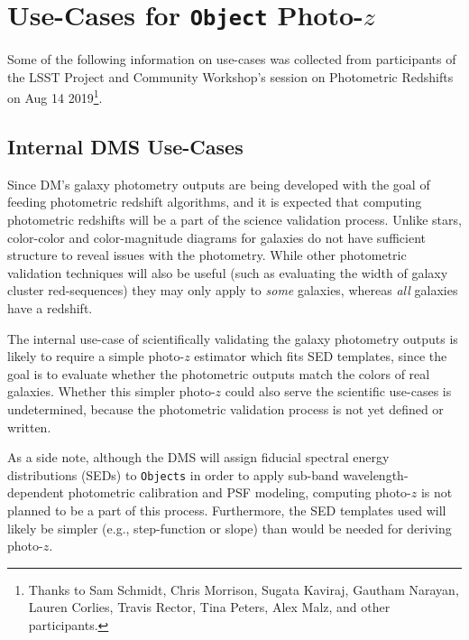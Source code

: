 \documentclass[DM,lsstdraft,toc]{lsstdoc}
\begin{document}




\section{Use-Cases for {\tt Object} Photo-$z$} \label{sec:use}

Some of the following information on use-cases was collected from participants of the LSST Project and Community Workshop's session on Photometric Redshifts on Aug 14 2019\footnote{Thanks to Sam Schmidt, Chris Morrison, Sugata Kaviraj, Gautham Narayan, Lauren Corlies, Travis Rector, Tina Peters, Alex Malz, and other participants.}.

\subsection{Internal DMS Use-Cases}\label{ssec:use_dm}

Since DM's galaxy photometry outputs are being developed with the goal of feeding photometric redshift algorithms, and it is expected that computing photometric redshifts will be a part of the science validation process. 
Unlike stars, color-color and color-magnitude diagrams for galaxies do not have sufficient structure to reveal issues with the photometry.
While other photometric validation techniques will also be useful (such as evaluating the width of galaxy cluster red-sequences) they may only apply to {\it some} galaxies, whereas {\it all} galaxies have a redshift. 

The internal use-case of scientifically validating the galaxy photometry outputs is likely to require a simple photo-$z$ estimator which fits SED templates, since the goal is to evaluate whether the photometric outputs match the colors of real galaxies.
Whether this simpler photo-$z$ could also serve the scientific use-cases is undetermined, because the photometric validation process is not yet defined or written.

As a side note, although the DMS will assign fiducial spectral energy distributions (SEDs) to {\tt Objects} in order to apply sub-band wavelength-dependent photometric calibration and PSF modeling, computing photo-$z$ is not planned to be a part of this process.
Furthermore, the SED templates used will likely be simpler (e.g., step-function or slope) than would be needed for deriving photo-$z$.
\end{document}
